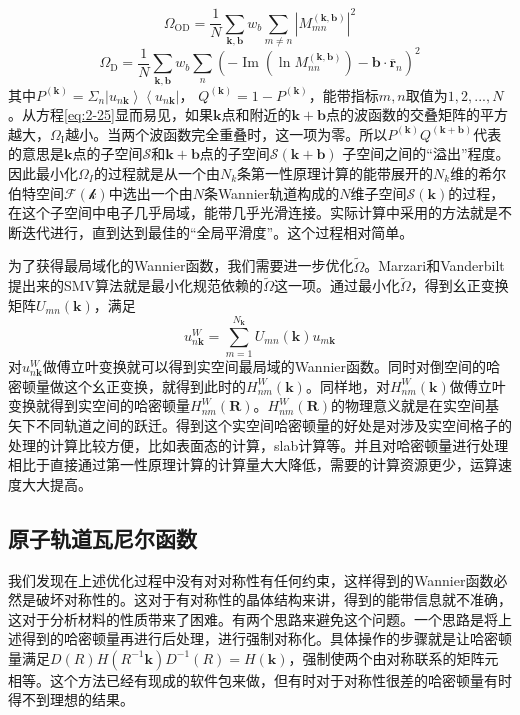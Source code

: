 %
\begin{equation}
    \label{eq:2-26}
    \Omega_{\mathrm{OD}}=\frac{1}{N} \sum_{\mathbf{k}, \mathbf{b}} w_{b} \sum_{m \neq n}\left|M_{m n}^{(\mathbf{k}, \mathbf{b})}\right|^{2} 
\end{equation}
%
\begin{equation}
    \label{eq:2-27}
    \Omega_{\mathrm{D}}=\frac{1}{N} \sum_{\mathbf{k}, \mathbf{b}} w_{b} \sum_{n}\left(-\operatorname{Im} (\ln M_{n n}^{(\mathbf{k}, \mathbf{b})})-\mathbf{b} \cdot \overline{\mathbf{r}}_{n}\right)^{2}
\end{equation}
其中$P^{(\mathbf{k})}=\Sigma_{n}\left|u_{n \mathbf{k}}\right\rangle\left\langle u_{n \mathbf{k}}\right|$， $Q^{(\mathbf{k})}=1-P^{(\mathbf{k})}$，能带指标$m,n$取值为$1,2,...,N$。从方程\ref{eq:2-25}显而易见，如果$\mathbf{k}$点和附近的$\mathbf{k+b}$点的波函数的交叠矩阵的平方越大，$\Omega_{\mathrm{I}}$越小。当两个波函数完全重叠时，这一项为零。所以$P^{(\mathbf{k})} Q^{(\mathbf{k}+\mathbf{b})}$代表的意思是$\mathbf{k}$点的子空间$\mathcal{S}$和$\mathbf{k+b}$点的子空间$\mathcal{S(\mathbf{k+b})}$ 子空间之间的“溢出”程度。
因此最小化$\Omega_I$的过程就是从一个由$N_k$条第一性原理计算的能带展开的$N_k$维的希尔伯特空间$\mathcal{F(k)}$中选出一个由$N$条Wannier轨道构成的$N$维子空间$\mathcal{S(\mathbf{k})}$的过程，在这个子空间中电子几乎局域，能带几乎光滑连接。实际计算中采用的方法就是不断迭代进行，直到达到最佳的“全局平滑度”。这个过程相对简单。

为了获得最局域化的Wannier函数，我们需要进一步优化$\tilde{\Omega}$。Marzari和Vanderbilt提出来的SMV算法\citep{wf2}就是最小化规范依赖的$\tilde{\Omega}$这一项。通过最小化$\tilde{\Omega}$，得到幺正变换矩阵$U_{m n}(\mathbf{k})$，满足
\begin{equation}
    \label{eq:2-28}
    u_{n \mathbf{k}}^{W}=\sum_{m=1}^{N_{\mathbf{k}}} U_{m n}(\mathbf{k}) u_{m \mathbf{k}}
\end{equation}
对$u_{n \mathbf{k}}^{W}$做傅立叶变换就可以得到实空间最局域的Wannier函数。同时对倒空间的哈密顿量做这个幺正变换，就得到此时的$H^W_{nm}(\mathbf{k})$。同样地，对$H^W_{nm}(\mathbf{k})$做傅立叶变换就得到实空间的哈密顿量$H^W_{nm}(\mathbf{R})$。$H^W_{nm}(\mathbf{R})$的物理意义就是在实空间基矢下不同轨道之间的跃迁。得到这个实空间哈密顿量的好处是对涉及实空间格子的处理的计算比较方便，比如表面态的计算，slab计算等。并且对哈密顿量进行处理相比于直接通过第一性原理计算的计算量大大降低，需要的计算资源更少，运算速度大大提高。

\subsection{原子轨道瓦尼尔函数}
我们发现在上述优化过程中没有对对称性有任何约束，这样得到的Wannier函数必然是破坏对称性的。这对于有对称性的晶体结构来讲，得到的能带信息就不准确，这对于分析材料的性质带来了困难。有两个思路来避免这个问题。一个思路是将上述得到的哈密顿量再进行后处理，进行强制对称化。具体操作的步骤就是让哈密顿量满足$
D(R) H\left(R^{-1} \mathbf{k}\right) D^{-1}(R)=H(\mathbf{k})
$，强制使两个由对称联系的矩阵元相等。这个方法已经有现成的软件包来做，但有时对于对称性很差的哈密顿量有时得不到理想的结果。

